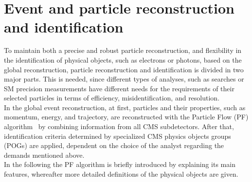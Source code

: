\section{Event and particle reconstruction and identification}\label{sec:reco}
To maintain both a precise and robust particle reconstruction, and flexibility in the identification of physical objects, such as electrons or photons, based on the global reconstruction, particle reconstruction and identification is divided in two major parts. This is needed, since different types of analyses, such as searches or SM precision measurements have different needs for the requirements of their selected particles in terms of efficiency, misidentification, and resolution.\\
In the global event reconstruction, at first, particles and their properties, such as momentum, energy, and trajectory, are reconstructed with the Particle Flow (PF) algorithm~\cite{ParticleFlow} by combining information from all CMS subdetectors. After that, identification criteria determined by specialized CMS physics objects groups (POGs) are applied, dependent on the choice of the analyst regarding the demands mentioned above.\\
In the following the PF algorithm is briefly introduced by explaining its main features, whereafter more detailed definitions of the physical objects are given.

